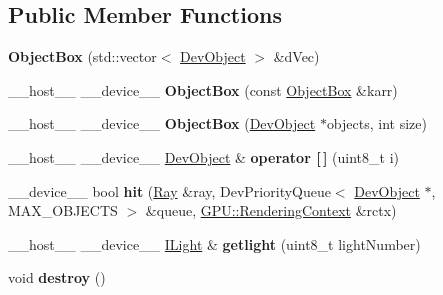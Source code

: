 \subsection*{Public Member Functions}
\begin{DoxyCompactItemize}
\item 
{\bfseries Object\+Box} (std\+::vector$<$ \hyperlink{class_dev_object}{Dev\+Object} $>$ \&d\+Vec)\hypertarget{class_object_box_aafbc94494fbc8d4cdb62f8cb1f051003}{}\label{class_object_box_aafbc94494fbc8d4cdb62f8cb1f051003}

\item 
\+\_\+\+\_\+host\+\_\+\+\_\+ \+\_\+\+\_\+device\+\_\+\+\_\+ {\bfseries Object\+Box} (const \hyperlink{class_object_box}{Object\+Box} \&karr)\hypertarget{class_object_box_aa87628a92437a186a84efabb697a972f}{}\label{class_object_box_aa87628a92437a186a84efabb697a972f}

\item 
\+\_\+\+\_\+host\+\_\+\+\_\+ \+\_\+\+\_\+device\+\_\+\+\_\+ {\bfseries Object\+Box} (\hyperlink{class_dev_object}{Dev\+Object} $\ast$objects, int size)\hypertarget{class_object_box_af145281cc745ea12a7d323154d77a4a2}{}\label{class_object_box_af145281cc745ea12a7d323154d77a4a2}

\item 
\+\_\+\+\_\+host\+\_\+\+\_\+ \+\_\+\+\_\+device\+\_\+\+\_\+ \hyperlink{class_dev_object}{Dev\+Object} \& {\bfseries operator \mbox{[}$\,$\mbox{]}} (uint8\+\_\+t i)\hypertarget{class_object_box_a93aa063210479567f9817f8fe28db3f0}{}\label{class_object_box_a93aa063210479567f9817f8fe28db3f0}

\item 
\+\_\+\+\_\+device\+\_\+\+\_\+ bool {\bfseries hit} (\hyperlink{class_ray}{Ray} \&ray, Dev\+Priority\+Queue$<$ \hyperlink{class_dev_object}{Dev\+Object} $\ast$, M\+A\+X\+\_\+\+O\+B\+J\+E\+C\+TS $>$ \&queue, \hyperlink{struct_g_p_u_1_1_rendering_context}{G\+P\+U\+::\+Rendering\+Context} \&rctx)\hypertarget{class_object_box_a2414c6dfe6ea1f11fadbb37f96b9a463}{}\label{class_object_box_a2414c6dfe6ea1f11fadbb37f96b9a463}

\item 
\+\_\+\+\_\+host\+\_\+\+\_\+ \+\_\+\+\_\+device\+\_\+\+\_\+ \hyperlink{class_i_light}{I\+Light} \& {\bfseries getlight} (uint8\+\_\+t light\+Number)\hypertarget{class_object_box_adf08ee78e3a68ed05a02d3d2a677f04c}{}\label{class_object_box_adf08ee78e3a68ed05a02d3d2a677f04c}

\item 
void {\bfseries destroy} ()\hypertarget{class_object_box_ac5a98f92851297ed083ea54dd539d129}{}\label{class_object_box_ac5a98f92851297ed083ea54dd539d129}


\end{DoxyCompactItemize}
